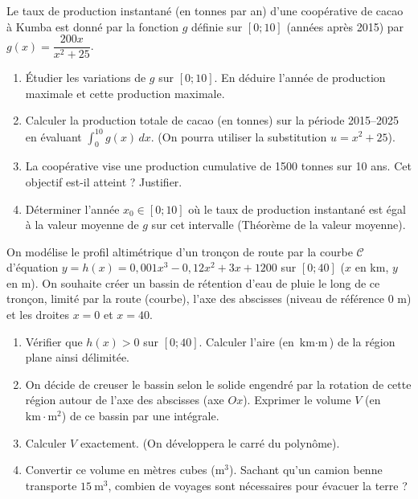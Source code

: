 \documentclass[11pt]{article}
\begin{document}
\begin{exercice}
Le taux de production instantané (en tonnes par an) d'une coopérative de cacao à Kumba est donné par la fonction $g$ définie sur $[0; 10]$ (années après 2015) par $g(x) = \dfrac{200x}{x^2 + 25}$.
\begin{enumerate}
    \item Étudier les variations de $g$ sur $[0; 10]$. En déduire l'année de production maximale et cette production maximale.
    \item Calculer la production totale de cacao (en tonnes) sur la période 2015--2025 en évaluant $\int_{0}^{10} g(x)\,dx$. (On pourra utiliser la substitution $u = x^2 + 25$).
    \item La coopérative vise une production cumulative de 1500 tonnes sur 10 ans. Cet objectif est-il atteint ? Justifier.
    \item Déterminer l'année $x_0 \in [0; 10]$ où le taux de production instantané est égal à la valeur moyenne de $g$ sur cet intervalle (Théorème de la valeur moyenne).
\end{enumerate}
\end{exercice}

\begin{exercice}
On modélise le profil altimétrique d'un tronçon de route par la courbe $\mathcal{C}$ d'équation $y = h(x) = 0,001x^3 - 0,12x^2 + 3x + 1200$ sur $[0; 40]$ ($x$ en km, $y$ en m). On souhaite créer un bassin de rétention d'eau de pluie le long de ce tronçon, limité par la route (courbe), l'axe des abscisses (niveau de référence 0 m) et les droites $x=0$ et $x=40$.
\begin{enumerate}
    \item Vérifier que $h(x) > 0$ sur $[0; 40]$. Calculer l'aire (en $\text{km}\cdot\text{m}$) de la région plane ainsi délimitée.
    \item On décide de creuser le bassin selon le solide engendré par la rotation de cette région autour de l'axe des abscisses (axe $Ox$). Exprimer le volume $V$ (en $\text{km}\cdot\text{m}^2$) de ce bassin par une intégrale.
    \item Calculer $V$ exactement. (On développera le carré du polynôme).
    \item Convertir ce volume en mètres cubes ($\text{m}^3$). Sachant qu'un camion benne transporte $\SI{15}{\cubic\meter}$, combien de voyages sont nécessaires pour évacuer la terre ?
\end{enumerate}
\end{exercice}
\end{document}
